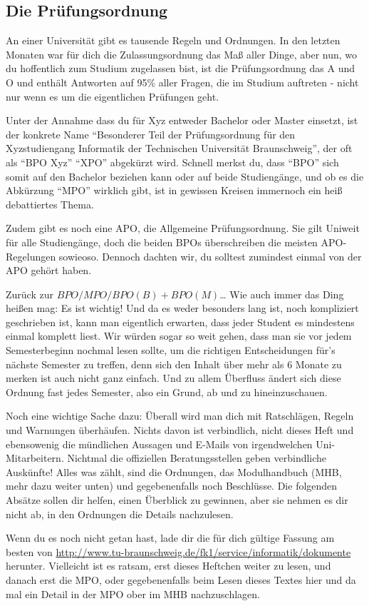 \label{po}\subsection{Die Prüfungsordnung}
An einer Universität gibt es tausende Regeln und Ordnungen. In den letzten Monaten war für dich die Zulassungsordnung das Maß aller Dinge, aber nun, wo du hoffentlich zum Studium zugelassen bist, ist die Prüfungsordnung das A und O und enthält Antworten auf 95\% aller Fragen, die im Studium auftreten - nicht nur wenn es um die eigentlichen Prüfungen geht. 

Unter der Annahme dass du für Xyz entweder Bachelor oder Master einsetzt, ist der konkrete Name "`Besonderer Teil der Prüfungsordnung für den Xyzstudiengang Informatik der Technischen Universität Braunschweig"', der oft als "`BPO Xyz"' "`XPO"' abgekürzt wird. Schnell merkst du, dass "`BPO"' sich somit auf den Bachelor beziehen kann oder auf beide Studiengänge, und ob es die Abkürzung "`MPO"' wirklich gibt, ist in gewissen Kreisen immernoch ein heiß debattiertes Thema.

Zudem gibt es noch eine APO, die Allgemeine Prüfungsordnung. Sie gilt Uniweit für alle Studiengänge, doch die beiden BPOs überschreiben die meisten APO-Regelungen sowieoso. Dennoch dachten wir, du solltest zumindest einmal von der APO gehört haben.

Zurück zur $BPO/MPO/BPO(B)+BPO(M)$\ldots{} Wie auch immer das Ding heißen mag: Es ist wichtig! Und da es weder besonders lang ist, noch kompliziert geschrieben ist, kann man eigentlich erwarten, dass jeder Student es mindestens einmal komplett liest. Wir würden sogar so weit gehen, dass man sie vor jedem Semesterbeginn nochmal lesen sollte, um die richtigen Entscheidungen für's nächste Semester zu treffen, denn sich den Inhalt über mehr als 6 Monate zu merken ist auch nicht ganz einfach. Und zu allem Überfluss ändert sich diese Ordnung fast jedes Semester, also ein Grund, ab und zu hineinzuschauen.

Noch eine wichtige Sache dazu: Überall wird man dich mit Ratschlägen,
Regeln und Warnungen überhäufen. Nichts davon ist verbindlich, nicht
dieses Heft und ebensowenig die mündlichen Aussagen und E-Mails von
irgendwelchen Uni-Mitarbeitern. Nichtmal die offiziellen Beratungsstellen geben verbindliche Auskünfte! Alles was zählt, sind die Ordnungen, das Modulhandbuch (MHB, mehr dazu weiter unten) und gegebenenfalls noch Beschlüsse. Die folgenden Absätze sollen dir helfen, einen Überblick zu gewinnen, aber sie nehmen es dir nicht ab, in den Ordnungen die Details nachzulesen.

Wenn du es noch nicht getan hast, lade dir die für dich gültige Fassung am besten von \url{http://www.tu-braunschweig.de/fk1/service/informatik/dokumente} herunter. Vielleicht ist es ratsam, erst dieses Heftchen weiter zu lesen, und danach erst die MPO, oder gegebenenfalls beim Lesen dieses Textes hier und da mal ein Detail in der MPO ober im MHB nachzuschlagen.

